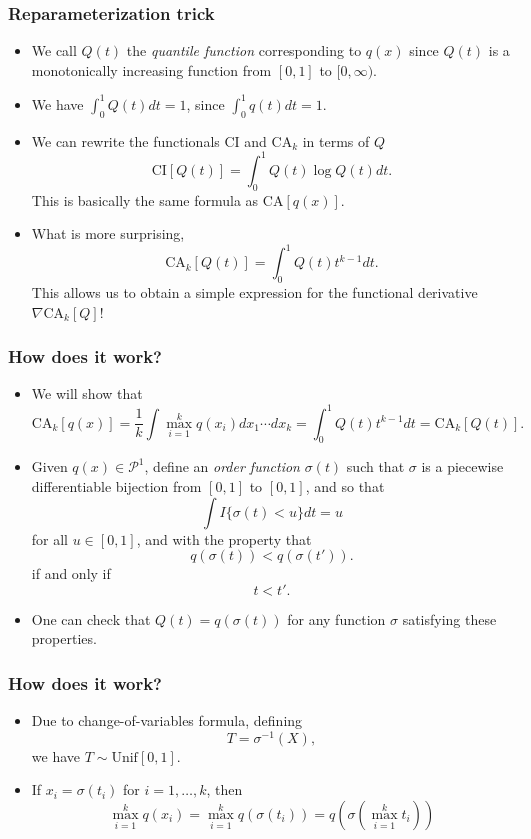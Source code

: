 \documentclass{beamer}
\begin{document}
\begin{frame}
\frametitle{Reparameterization trick}
\begin{itemize}
\item We call $Q(t)$ the \emph{quantile function} corresponding to
  $q(x)$ since $Q(t)$ is a monotonically increasing function from
  $[0,1]$ to $[0,\infty)$.
\item We have $\int_0^1 Q(t) dt = 1$, since $\int_0^1 q(t) dt = 1$.
\item We can rewrite the functionals $\text{CI}$ and $\text{CA}_k$ in terms of $Q$
\[
\text{CI}[Q(t)] = \int_0^1 Q(t) \log Q(t) dt.
\]
This is basically the same formula as $\text{CA}[q(x)]$.
\item What is more surprising,
\[
\text{CA}_k[Q(t)] = \int_0^1 Q(t) t^{k-1} dt.
\]
This allows us to obtain a simple expression for the functional derivative $\nabla \text{CA}_k[Q]$!
\end{itemize}
\end{frame}

\begin{frame}
\frametitle{How does it work?}
\begin{itemize}
\item We will show that
\[
\text{CA}_k[q(x)] = \frac{1}{k}\int \max_{i=1}^k q(x_i) dx_1 \cdots dx_k = \int_0^1 Q(t) t^{k-1} dt = \text{CA}_k[Q(t)].
\]
\item Given $q(x) \in \mathcal{P}^1$, define an \emph{order function} $\sigma(t)$
such that $\sigma$ is a piecewise differentiable bijection from $[0,1]$ to $[0,1]$, and so that
\[
\int I\{\sigma(t) < u\} dt = u
\]
for all $u \in [0,1]$,
and with the property that
\[
q(\sigma(t)) < q(\sigma(t')).
\]
if and only if
\[
t < t'.
\]
\item One can check that $Q(t) = q(\sigma(t))$ for any function $\sigma$ satisfying these properties.
\end{itemize}
\end{frame}

\begin{frame}
\frametitle{How does it work?}
\begin{itemize}
\item Due to change-of-variables formula, defining
\[T = \sigma^{-1}(X),\]
we have $T \sim \text{Unif}[0,1]$.
\item If $x_i = \sigma(t_i)$ for $i = 1,\hdots, k$, then
\[
\max_{i=1}^k q(x_i) = \max_{i=1}^k q(\sigma(t_i)) = q(\sigma\left(\max_{i=1}^k t_i\right))
\]
\end{itemize}
\end{frame}
\end{document}
